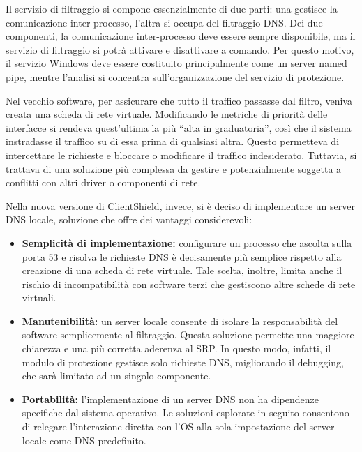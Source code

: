 \documentclass[12pt,a4paper,openright,twoside]{book}
\begin{document}
Il servizio di filtraggio si compone essenzialmente di due parti: una gestisce la comunicazione inter-processo, l'altra si occupa del filtraggio \gls{DNS}.
Dei due componenti, la comunicazione inter-processo deve essere sempre disponibile, ma il servizio di filtraggio si potrà attivare e disattivare a comando.
Per questo motivo, il servizio Windows deve essere costituito principalmente come un server named pipe, mentre l'analisi si concentra sull'organizzazione del servizio di protezione.

Nel vecchio software, per assicurare che tutto il traffico passasse dal filtro, veniva creata una scheda di rete virtuale.
Modificando le metriche di priorità delle interfacce si rendeva quest’ultima la più “alta in graduatoria”, così che il sistema instradasse il traffico su di essa prima di qualsiasi altra. Questo permetteva di intercettare le richieste e bloccare o modificare il traffico indesiderato. Tuttavia, si trattava di una soluzione più complessa da gestire e potenzialmente soggetta a conflitti con altri driver o componenti di rete.

Nella nuova versione di ClientShield, invece, si è deciso di implementare un server \gls{DNS} locale, soluzione che offre dei vantaggi considerevoli:

\begin{itemize}
	\item \textbf{Semplicità di implementazione:}
	configurare un processo che ascolta sulla porta 53 e risolva le richieste \gls{DNS} è decisamente più semplice rispetto alla creazione di una scheda di rete virtuale.
	Tale scelta, inoltre, limita anche il rischio di incompatibilità con software terzi che gestiscono altre schede di rete virtuali.
	
	\item \textbf{Manutenibilità:}
	un server locale consente di isolare la responsabilità del software semplicemente al filtraggio.
	Questa soluzione permette una maggiore chiarezza e una più corretta aderenza al \gls{SRP}.%
	In questo modo, infatti, il modulo di protezione gestisce solo richieste \gls{DNS}, migliorando il debugging, che sarà limitato ad un singolo componente.
	
	\item \textbf{Portabilità:}
	l'implementazione di un server \gls{DNS} non ha dipendenze specifiche dal sistema operativo.
	Le soluzioni esplorate in seguito consentono di relegare l'interazione diretta con l'\gls{OS} alla sola impostazione del server locale come \gls{DNS} predefinito.
\end{itemize}
\end{document}
